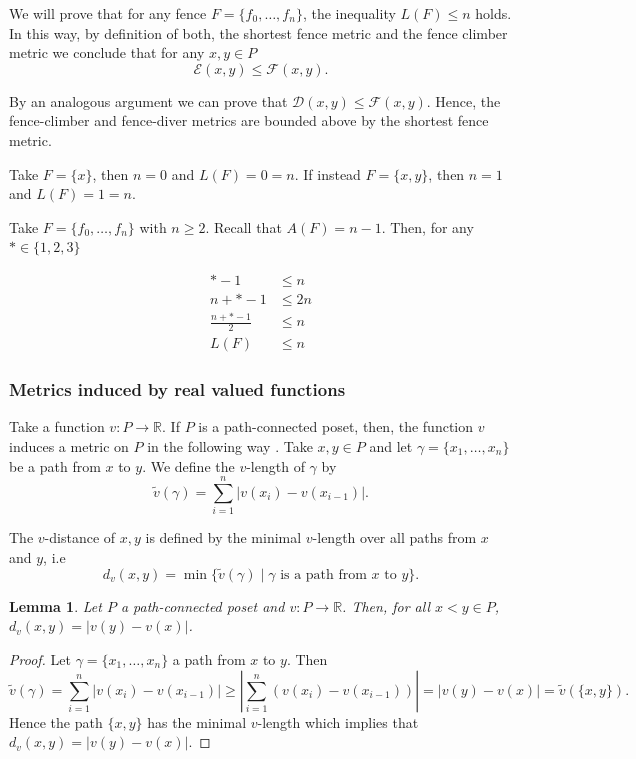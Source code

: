\documentclass{article}[12pt]
\theoremstyle{exampstyle}
\newtheorem{lemma}[theorem]{Lemma}
\theoremstyle{remark}
\newcommand{\R}{\mathbb{R}}
\newcommand{\D}{\mathcal{D}}
\newcommand{\E}{\mathcal{E}}
\newcommand{\F}{\mathcal{F}}
\newcommand{\tuple}[3][1]{#2_{#1}, \dots , #2_{#3}}
\begin{document}
We will prove that for any fence $F = \{ \tuple[0]{f}{n}\}$, the inequality $L(F) \leq n$ holds. In this way, by definition of both, the shortest fence metric and the fence climber metric we conclude that for any $x,y \in P$
\begin{equation*}
    \E(x,y) \leq \F(x,y).
\end{equation*}

By an analogous argument we can prove that $ \D(x,y) \leq \F(x,y)$. Hence, the fence-climber and fence-diver metrics are bounded above by the shortest fence metric.

Take $F = \{x\}$, then $n=0$ and $L(F) = 0 = n$. If instead $F = \{x,y\}$, then $n=1$ and $L(F) = 1 = n$.

Take $F = \{ \tuple[0]{f}{n} \}$ with $n \geq 2$. Recall that $A(F) = n-1 $. Then, for any $* \in \{1,2,3\}$ 

\begin{align*}
    * - 1 &\leq n \\
    n + * - 1 &\leq 2n \\
    \frac{n + * - 1}{2} &\leq n \\
    L(F) &\leq n
\end{align*}

\subsubsection*{Metrics induced by real valued functions}

Take a function $v: P \to \R$. If $P$ is a path-connected poset, then, the function $v$ induces a metric on $P$ in the following way \cite{remarques}. Take $x,y \in P$ and let $\gamma = \{ \tuple{x}{n}\}$  be a path from $x$ to $y$. We define the $v$-length of $\gamma$ by 
\begin{equation*}
    \tilde{v}(\gamma) =  \sum_{i = 1}^n | v(x_{i}) - v(x_{i-1})|  .
\end{equation*}

The $v$-distance of $x,y$ is defined by the minimal $v$-length over all paths from $x$ and $y$, i.e
\begin{equation*} 
    d_v(x,y) = \min \{ \tilde{v}(\gamma) \mid \gamma \text { is a  path from } x \text{ to } y \}.
\end{equation*}

\begin{lemma}
    Let $P$ a path-connected poset and $v:P \to \R$. Then, for all $x < y \in P$, $d_v(x,y) = |v(y) - v(x)|$.
\end{lemma}
\begin{proof}
    Let $\gamma = \{ \tuple{x}{n}\}$ a path from $x$ to $y$. Then 
    \begin{equation*}
        \tilde{v}(\gamma) = \sum_{i = 1}^n | v(x_{i}) - v(x_{i-1})|  \geq \left| \sum_{i = 1}^n  (v(x_{i}) - v(x_{i-1}) )\right| = |v(y) - v(x)| = \tilde{v}(\{x,y\}).
    \end{equation*}
    Hence the path $\{x,y\}$ has the minimal $v$-length which implies that $d_v(x,y) = |v(y) - v(x)|$.
\end{proof}
\end{document}
